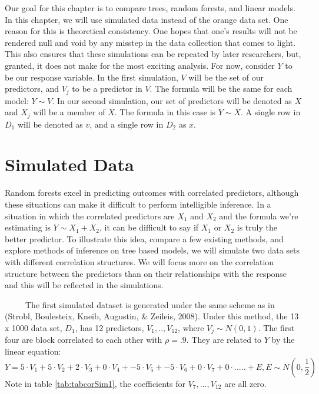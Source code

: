 \documentclass[12pt,twoside]{reedthesis}
\begin{document}
  Our goal for this chapter is to compare trees, random forests, and
  linear models. In this chapter, we will use simulated data instead of
  the orange data set. One reason for this is theoretical consistency. One
  hopes that one's results will not be rendered null and void by any
  misstep in the data collection that comes to light. This also ensures
  that these simulations can be repeated by later researchers, but,
  granted, it does not make for the most exciting analysis. For now,
  consider \(Y\) to be our response variable. In the first simulation,
  \(V\) will be the set of our predictors, and \(V_j\) to be a predictor
  in \(V\). The formula will be the same for each model: \(Y \sim V\). In
  our second simulation, our set of predictors will be denoted as \(X\)
  and \(X_j\) will be a member of \(X\). The formula in this case is
  \(Y \sim X\). A single row in \(D_1\) will be denoted as \(v\), and a
  single row in \(D_2\) as \(x\).
  
  \section{Simulated Data}\label{simulated-data}
  
  Random forests excel in predicting outcomes with correlated predictors,
  although these situations can make it difficult to perform intelligible
  inference. In a situation in which the correlated predictors are \(X_1\)
  and \(X_2\) and the formula we're estimating is \(Y \sim X_1 + X_2\), it
  can be difficult to say if \(X_1\) or \(X_2\) is truly the better
  predictor. To illustrate this idea, compare a few existing methods, and
  explore methods of inference on tree based models, we will simulate two
  data sets with different correlation structures. We will focus more on
  the correlation structure between the predictors than on their
  relationships with the response and this will be reflected in the
  simulations.
  
  ~~~~~The first simulated dataset is generated under the same scheme as
  in (Strobl, Boulesteix, Kneib, Augustin, \& Zeileis, 2008). Under this
  method, the 13 x 1000 data set, \(D_1\), has 12 predictors,
  \(V_1,..,V_{12}\), where \(V_j \sim N(0,1)\). The first four are block
  correlated to each other with \(\rho = .9\). They are related to \(Y\)
  by the linear equation:
  \[Y = 5 \cdot V_1 + 5 \cdot V_2 + 2 \cdot V_3 + 0 \cdot V_4 + -5 \cdot V_5 + -5\cdot V_6 + 0\cdot V_7 + 0 \cdot ..... + E, E \sim N(0,\frac 1 2 )\]
  Note in table \ref{tab:tabcorSim1}, the coefficients for
  \(V_7,...,V_{12}\) are all zero.
  
\end{document}
